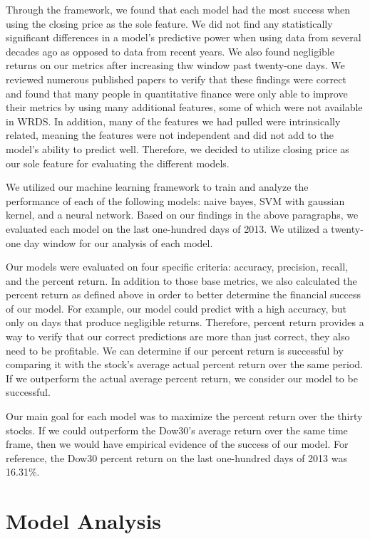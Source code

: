\documentclass{article}
\begin{document}
Through the framework, we found that each model had the most success when using the closing price as the sole feature. We did not find any statistically significant differences in a model's predictive power when using data from several decades ago as opposed to data from recent years. We also found negligible returns on our metrics after increasing thw window past twenty-one days. We reviewed numerous published papers to verify that these findings were correct and found that many people in quantitative finance were only able to improve their metrics by using many additional features, some of which were not available in WRDS. In addition, many of the features we had pulled were intrinsically related, meaning the features were not independent and did not add to the model's ability to predict well. Therefore, we decided to utilize closing price as our sole feature for evaluating the different models.

We utilized our machine learning framework to train and analyze the performance of each of the following models: naive bayes, SVM with gaussian kernel, and a neural network. Based on our findings in the above paragraphs, we evaluated each model on the last one-hundred days of 2013. We utilized a twenty-one day window for our analysis of each model.

Our models were evaluated on four specific criteria: accuracy, precision, recall, and the percent return. In addition to those base metrics, we also calculated the percent return as defined above in order to better determine the financial success of our model. For example, our model could predict with a high accuracy, but only on days that produce negligible returns. Therefore, percent return provides a way to verify that our correct predictions are more than just correct, they also need to be profitable. We can determine if our percent return is successful by comparing it with the stock's average actual percent return over the same period. If we outperform the actual average percent return, we consider our model to be successful.

Our main goal for each model was to maximize the percent return over the thirty stocks. If we could outperform the Dow30's average return over the same time frame, then we would have empirical evidence of the success of our model. For reference, the Dow30 percent return on the last one-hundred days of 2013 was 16.31\%.

\section{Model Analysis}
\end{document}
